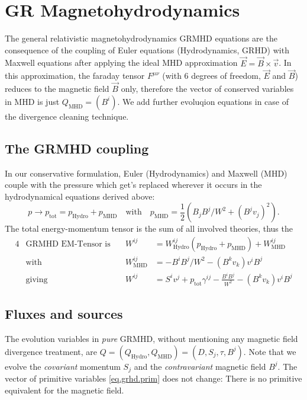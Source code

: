 \documentclass[a4paper]{article}
\newcommand{\desc}[1]{\text{#1}\quad}
\newcommand{\hydro}{\text{Hydro}}
\newcommand{\mhd}{\text{MHD}}
\begin{document}
\section{GR Magnetohydrodynamics}

The general relativistic magnetohydrodynamics GRMHD equations are
the consequence of the coupling of Euler equations 
(Hydrodynamics, GRHD) with Maxwell equations after applying the ideal MHD
approximation $\vec E = \vec B \times \vec v$. In this approximation,
the faraday tensor $F^{\mu\nu}$ (with 6 degrees of freedom, $\vec E$ 
and $\vec B$) reduces to the magnetic field $\vec B$ only, therefore the
vector of conserved variables in MHD is just $Q_\mhd = (B^i)$. We add
further evoluqion equations in case of the divergence cleaning technique.

\subsection{The GRMHD coupling}
In our conservative formulation, Euler (Hydrodynamics) and Maxwell (MHD)
couple with the pressure which get's replaced wherever it occurs in the
hydrodynamical equations derived above:
\begin{equation}
p \to p_\text{tot} = p_\hydro + p_\mhd
\quad\text{with}\quad
p_\mhd = \frac 12 \left( B_j B^j / W^2 + (B^j v_j)^2 \right).
\end{equation}
The total energy-momentum tensor is the sum of all involved theories,
thus the
\begin{alignat}{4}
& \desc{GRMHD EM-Tensor is}
& W^{ij} &= W^{ij}_\hydro(p_\hydro + p_\mhd) + W^{ij}_\mhd
\\
&\desc{with}
& W^{ij}_\mhd &= - B^i B^j / W^2 - (B^k v_k) v^i B^j
\\
&\desc{giving}
& W^{ij} &= 
S^i v^j + p_\text{tot} \gamma^{ij} - \frac{B^i B^j}{W^2} - (B^k v_k)v^i B^j
\end{alignat}

\subsection{Fluxes and sources}
The evolution variables in \emph{pure} GRMHD, without mentioning any
magnetic field divergence treatment, are 
$Q = (Q_\hydro, Q_\mhd) = (D, S_j, \tau, B^j)$.
Note that we evolve the \emph{covariant} momentum $S_j$ and the
\emph{contravariant} magnetic field $B^j$. The vector of primitive
variables \eqref{eq.grhd.prim} does not change: There is no primitive
equivalent for the magnetic field.
\end{document}
